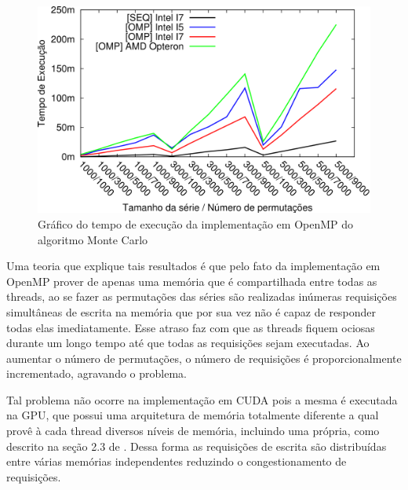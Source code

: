 \begin{figure}[H]
\centering
\includegraphics[]{Imagens/graficos_mcarlo/mcarlo_omp.png}
\caption{Gráfico do tempo de execução da implementação em OpenMP do algoritmo Monte Carlo}
\label{fig:grafico_mcarlo_omp}
\end{figure}

Uma teoria que explique tais resultados é que pelo fato da implementação em OpenMP prover de apenas uma memória que é compartilhada entre todas as threads, ao se fazer as permutações das séries são realizadas inúmeras requisições simultâneas de escrita na memória que por sua vez não é capaz de responder todas elas imediatamente. Esse atraso faz com que as threads fiquem ociosas durante um longo tempo até que todas as requisições sejam executadas. Ao aumentar o número de permutações, o número de requisições é proporcionalmente incrementado, agravando o problema.

Tal problema não ocorre na implementação em CUDA pois a mesma é executada na GPU, que possui uma arquitetura de memória totalmente diferente a qual provê à cada thread diversos níveis de memória, incluindo uma própria, como descrito na seção 2.3 de \cite{cuda_guide}. Dessa forma as requisições de escrita são distribuídas entre várias memórias independentes reduzindo o congestionamento de requisições.

